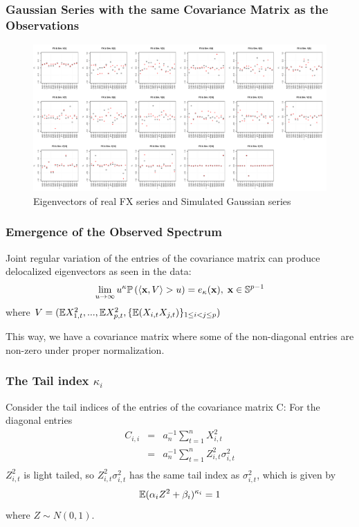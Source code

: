 \documentclass{beamer}
\begin{document}
\begin{frame}
  \frametitle{Gaussian Series with the same Covariance Matrix as the Observations}
  \begin{figure}[htb!]
    \centering
    \includegraphics[scale=0.2]{Gaussian_eigenvectors.pdf}
    \caption{\scriptsize Eigenvectors of real FX series and Simulated Gaussian series}
  \end{figure}
\end{frame}

\begin{frame}
  \frametitle{Emergence of the Observed Spectrum}
  Joint regular variation of the entries of the covariance matrix can
  produce delocalized eigenvectors as seen in the data:
  \[
  \lim_{u \to \infty} u^{\kappa}
  \mathbb{P}\left(
    \langle\mathbf{x}, V\rangle > u
  \right) = e_{\kappa}(\mathbf{x}),\; \mathbf{x} \in \mathbb S^{p-1}
  \]
  where $V=(\mathbb{E} X_{1,t}^2, ..., \mathbb{E} X_{p,t}^2,
  \{\mathbb{E} (X_{i,t}X_{j,t})\}_{1 \leq i < j \leq p})$

  This way, we have a covariance matrix where some of the non-diagonal
  entries are non-zero under proper normalization.
\end{frame}

\begin{frame}
  \frametitle{The Tail index $\kappa_i$}
  Consider the tail indices of the entries of the covariance matrix C:
  For the diagonal entries
    \begin{eqnarray*}
      C_{i, i} &=& a_n^{-1} \sum_{t=1}^n X_{i, t}^2 \\
      &=& a_n^{-1} \sum_{t=1}^n Z_{i, t}^2 \sigma_{i, t}^2 \\
    \end{eqnarray*}
    $Z_{i, t}^2$ is light tailed, so $Z_{i, t}^2 \sigma_{i, t}^2$ has
    the same tail index as $\sigma_{i, t}^2$, which is given by
    \[
    \mathbb{E} (\alpha_i Z^2 + \beta_i)^{\kappa_i} = 1
    \]
    where $Z \sim N(0, 1)$.
  \end{frame}
\end{document}
